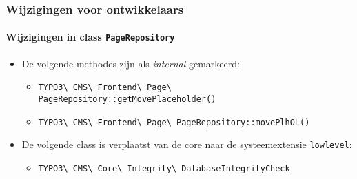
\begin{frame}[fragile]
	\frametitle{Wijzigingen voor ontwikkelaars}
	\framesubtitle{Wijzigingen in class \texttt{PageRepository}}

	\begin{itemize}
		\item De volgende methodes zijn als \textit{internal} gemarkeerd:

			\begin{itemize}
			\smaller
				\item \texttt{TYPO3\textbackslash
					CMS\textbackslash
					Frontend\textbackslash
					Page\textbackslash
					PageRepository::getMovePlaceholder()}

				\item \texttt{TYPO3\textbackslash
					CMS\textbackslash
					Frontend\textbackslash
					Page\textbackslash
					PageRepository::movePlhOL()}
			\end{itemize}

		\item De volgende class is verplaatst van de core naar de systeemextensie
			\texttt{lowlevel}:

			\begin{itemize}
			\smaller
				\item \texttt{TYPO3\textbackslash
					CMS\textbackslash
					Core\textbackslash
					Integrity\textbackslash
					DatabaseIntegrityCheck}
			\end{itemize}

	\end{itemize}

\end{frame}


